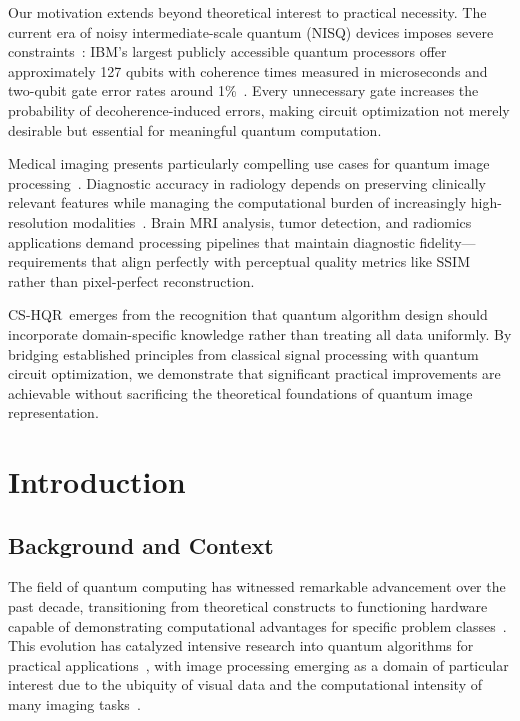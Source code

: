 \documentclass{ipol}
\newcommand{\cshqr}{\textsc{CS-HQR}}
\begin{document}
Our motivation extends beyond theoretical interest to practical necessity.
The current era of noisy intermediate-scale quantum (NISQ) devices imposes
severe constraints~\cite{ref27}: IBM's largest publicly accessible quantum processors offer
approximately 127 qubits with coherence times measured in microseconds and
two-qubit gate error rates around 1\%~\cite{ref9}. Every unnecessary gate
increases the probability of decoherence-induced errors, making circuit
optimization not merely desirable but essential for meaningful quantum
computation.

Medical imaging presents particularly compelling use cases for quantum image
processing~\cite{ref62,ref65,ref68}. Diagnostic accuracy in radiology depends on preserving clinically
relevant features while managing the computational burden of increasingly
high-resolution modalities~\cite{ref10}. Brain MRI analysis, tumor detection,
and radiomics applications demand processing pipelines that maintain
diagnostic fidelity---requirements that align perfectly with perceptual
quality metrics like SSIM rather than pixel-perfect reconstruction.

\cshqr\ emerges from the recognition that quantum algorithm design should
incorporate domain-specific knowledge rather than treating all data uniformly.
By bridging established principles from classical signal processing with
quantum circuit optimization, we demonstrate that significant practical
improvements are achievable without sacrificing the theoretical foundations
of quantum image representation.

\FloatBarrier
\section{Introduction}
\label{sec:introduction}

\FloatBarrier
\subsection{Background and Context}
\label{subsec:background}

The field of quantum computing has witnessed remarkable advancement over the
past decade, transitioning from theoretical constructs to functioning hardware
capable of demonstrating computational advantages for specific problem
classes~\cite{ref11}. This evolution has catalyzed intensive research into
quantum algorithms for practical applications~\cite{ref42,ref56,ref58}, with image processing emerging
as a domain of particular interest due to the ubiquity of visual data and the
computational intensity of many imaging tasks~\cite{ref12,ref23,ref40}.
\end{document}

